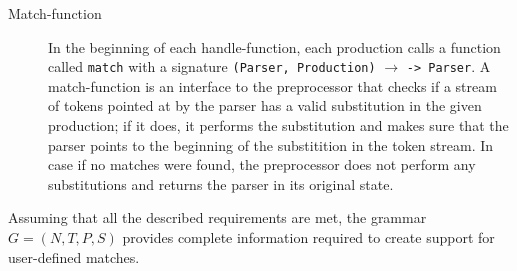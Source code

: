 \begin{description}
    \item[Match-function] In the beginning of each handle-function, each
    production calls a function called \verb|match| with a signature
    \verb/(Parser, Production)/ $\to$ \verb/-> Parser/.  A match-function 
    is an interface to the preprocessor that checks if a stream of tokens
    pointed at by the parser has a valid substitution in the given
    production; if it does, it performs the substitution and makes sure
    that the parser points to the beginning of the substitition in the
    token stream.  In case if no matches were found, the preprocessor
    does not perform any substitutions and returns the parser in its
    original state.
\end{description}

Assuming that all the described requirements are met, the grammar 
$G = (N, T, P, S)$ provides complete information required to create 
support for user-defined matches.

